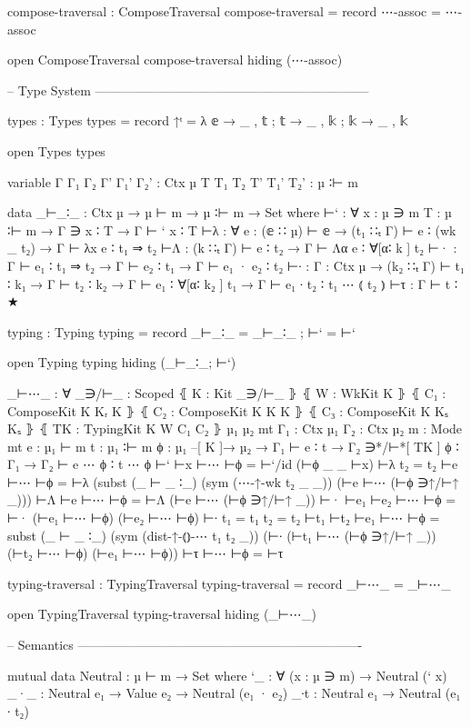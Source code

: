 \begin{code}
compose-traversal : ComposeTraversal
compose-traversal = record { ⋯-assoc = ⋯-assoc }

open ComposeTraversal compose-traversal hiding (⋯-assoc)

-- Type System -----------------------------------------------------------------

types : Types
types = record { ↑ᵗ = λ { 𝕖 → _ , 𝕥 ; 𝕥 → _ , 𝕜 ; 𝕜 → _ , 𝕜 } }

open Types types

variable
  Γ Γ₁ Γ₂ Γ' Γ₁' Γ₂' : Ctx µ
  T T₁ T₂ T' T₁' T₂' : µ ∶⊢ m

data _⊢_∶_ : Ctx µ → µ ⊢ m → µ ∶⊢ m → Set where
  ⊢` : ∀ {x : µ ∋ m} {T : µ ∶⊢ m} →
    Γ ∋ x ∶ T →
    Γ ⊢ ` x ∶ T
  ⊢λ : ∀ {e : (𝕖 ∷ µ) ⊢ 𝕖} →
    (t₁ ∷ₜ Γ) ⊢ e ∶ (wk _ t₂) →
    Γ ⊢ λx e ∶ t₁ ⇒ t₂
  ⊢Λ :
    (k ∷ₜ Γ) ⊢ e ∶ t₂ →
    Γ ⊢ Λα e ∶ ∀[α∶ k ] t₂
  ⊢· :
    Γ ⊢ e₁ ∶ t₁ ⇒ t₂ →
    Γ ⊢ e₂ ∶ t₁ →
    Γ ⊢ e₁ · e₂ ∶ t₂
  ⊢∙ : {Γ : Ctx µ} →
    (k₂ ∷ₜ Γ) ⊢ t₁ ∶ k₁ →
    Γ ⊢ t₂ ∶ k₂ →
    Γ ⊢ e₁ ∶ ∀[α∶ k₂ ] t₁ →
    Γ ⊢ e₁ ∙ t₂ ∶ t₁ ⋯ ⦅ t₂ ⦆
  ⊢τ :
    Γ ⊢ t ∶ ★

typing : Typing
typing = record { _⊢_∶_ = _⊢_∶_ ; ⊢` = ⊢` }

open Typing typing hiding (_⊢_∶_; ⊢`) 

_⊢⋯_ :
  ∀ {_∋/⊢_ : Scoped} ⦃ K : Kit _∋/⊢_ ⦄ ⦃ W : WkKit K ⦄
    ⦃ C₁ : ComposeKit K Kᵣ K ⦄ ⦃ C₂ : ComposeKit K K K ⦄
    ⦃ C₃ : ComposeKit K Kₛ Kₛ ⦄
    ⦃ TK : TypingKit K W C₁ C₂ ⦄
    {µ₁ µ₂ mt} {Γ₁ : Ctx µ₁} {Γ₂ : Ctx µ₂} {m : Mode mt}
    {e : µ₁ ⊢ m} {t : µ₁ ∶⊢ m} {ϕ : µ₁ –[ K ]→ µ₂} →
  Γ₁ ⊢ e ∶ t →
  Γ₂ ∋*/⊢*[ TK ] ϕ ∶ Γ₁ →
  Γ₂ ⊢ e ⋯ ϕ ∶ t ⋯ ϕ
⊢` ⊢x ⊢⋯ ⊢ϕ = ⊢`/id (⊢ϕ _ _ ⊢x)
⊢λ {t₂ = t₂} ⊢e ⊢⋯ ⊢ϕ = ⊢λ (subst (_ ⊢ _ ∶_) (sym (⋯-↑-wk t₂ _ _)) (⊢e ⊢⋯ (⊢ϕ ∋↑/⊢↑ _)))
⊢Λ ⊢e ⊢⋯ ⊢ϕ = ⊢Λ (⊢e ⊢⋯ (⊢ϕ ∋↑/⊢↑ _))
⊢· ⊢e₁ ⊢e₂ ⊢⋯ ⊢ϕ = ⊢· (⊢e₁ ⊢⋯ ⊢ϕ) (⊢e₂ ⊢⋯ ⊢ϕ)
⊢∙ {t₁ = t₁} {t₂ = t₂} ⊢t₁ ⊢t₂ ⊢e₁ ⊢⋯ ⊢ϕ = subst (_ ⊢ _ ∶_) (sym (dist-↑-⦅⦆-⋯ t₁ t₂ _))
                                                 (⊢∙ (⊢t₁ ⊢⋯ (⊢ϕ ∋↑/⊢↑ _)) (⊢t₂ ⊢⋯ ⊢ϕ) (⊢e₁ ⊢⋯ ⊢ϕ))
⊢τ ⊢⋯ ⊢ϕ = ⊢τ

typing-traversal : TypingTraversal
typing-traversal = record { _⊢⋯_ = _⊢⋯_ }

open TypingTraversal typing-traversal hiding (_⊢⋯_)

-- Semantics -------------------------------------------------------------------

mutual
  data Neutral : µ ⊢ m → Set where
    `_  : ∀ (x : µ ∋ m) → Neutral (` x)
    _·_ : Neutral e₁ → Value e₂ → Neutral (e₁ · e₂)
    _∙t : Neutral e₁ → Neutral (e₁ ∙ t₂)


\end{code}
